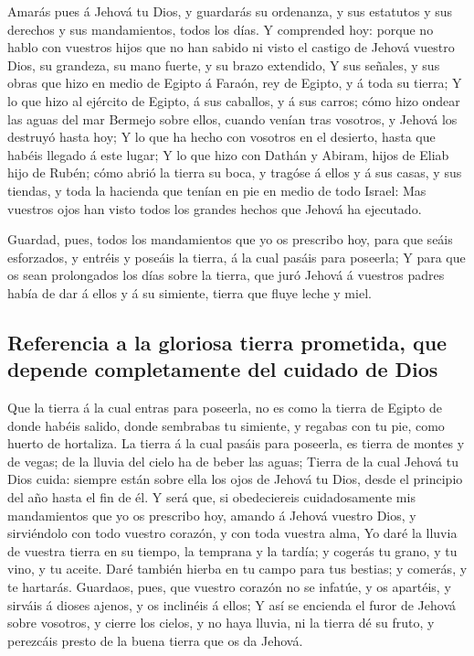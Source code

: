  Amarás pues á Jehová tu Dios, y guardarás su ordenanza, y
sus estatutos y sus derechos y sus mandamientos, todos los días.
 Y comprended hoy: porque no hablo con vuestros hijos que
no han sabido ni visto el castigo de Jehová vuestro Dios, su grandeza,
su mano fuerte, y su brazo extendido,  Y sus señales, y
sus obras que hizo en medio de Egipto á Faraón, rey de Egipto, y á toda
su tierra;  Y lo que hizo al ejército de Egipto, á sus
caballos, y á sus carros; cómo hizo ondear las aguas del mar Bermejo
sobre ellos, cuando venían tras vosotros, y Jehová los destruyó hasta
hoy;  Y lo que ha hecho con vosotros en el desierto, hasta
que habéis llegado á este lugar;  Y lo que hizo con Dathán
y Abiram, hijos de Eliab hijo de Rubén; cómo abrió la tierra su boca, y
tragóse á ellos y á sus casas, y sus tiendas, y toda la hacienda que
tenían en pie en medio de todo Israel:  Mas vuestros ojos
han visto todos los grandes hechos que Jehová ha ejecutado.

 Guardad, pues, todos los mandamientos que yo os prescribo
hoy, para que seáis esforzados, y entréis y poseáis la tierra, á la cual
pasáis para poseerla;  Y para que os sean prolongados los
días sobre la tierra, que juró Jehová á vuestros padres había de dar á
ellos y á su simiente, tierra que fluye leche y miel.

\hypertarget{referencia-a-la-gloriosa-tierra-prometida-que-depende-completamente-del-cuidado-de-dios}{%
\subsection{Referencia a la gloriosa tierra prometida, que depende
completamente del cuidado de
Dios}\label{referencia-a-la-gloriosa-tierra-prometida-que-depende-completamente-del-cuidado-de-dios}}

 Que la tierra á la cual entras para poseerla, no es como
la tierra de Egipto de donde habéis salido, donde sembrabas tu simiente,
y regabas con tu pie, como huerto de hortaliza.  La
tierra á la cual pasáis para poseerla, es tierra de montes y de vegas;
de la lluvia del cielo ha de beber las aguas;  Tierra de
la cual Jehová tu Dios cuida: siempre están sobre ella los ojos de
Jehová tu Dios, desde el principio del año hasta el fin de él.
 Y será que, si obedeciereis cuidadosamente mis
mandamientos que yo os prescribo hoy, amando á Jehová vuestro Dios, y
sirviéndolo con todo vuestro corazón, y con toda vuestra alma,
 Yo daré la lluvia de vuestra tierra en su tiempo, la
temprana y la tardía; y cogerás tu grano, y tu vino, y tu aceite.
 Daré también hierba en tu campo para tus bestias; y
comerás, y te hartarás.  Guardaos, pues, que vuestro
corazón no se infatúe, y os apartéis, y sirváis á dioses ajenos, y os
inclinéis á ellos;  Y así se encienda el furor de Jehová
sobre vosotros, y cierre los cielos, y no haya lluvia, ni la tierra dé
su fruto, y perezcáis presto de la buena tierra que os da Jehová.

